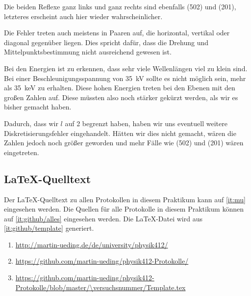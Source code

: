 Die beiden Reflexe ganz links und ganz rechts sind ebenfalls (502) und (201),
letzteres erscheint auch hier wieder wahrscheinlicher.

Die Fehler treten auch meistens in Paaren auf, die horizontal, vertikal oder
diagonal gegenüber liegen. Dies spricht dafür, dass die Drehung und
Mittelpunktsbestimmung nicht ausreichend gewesen ist.

Bei den Energien ist zu erkennen, dass sehr viele Wellenlängen viel zu klein
sind. Bei einer Beschleunigungsspannung von \SI{35}{\kilo\volt} sollte es
nicht möglich sein, mehr als \SI{35}{\kilo\electronvolt} zu erhalten. Diese
hohen Energien treten bei den Ebenen mit den großen Zahlen auf. Diese müssten
also noch stärker gekürzt werden, als wir es bisher gemacht haben.

Dadurch, dass wir $l$ auf 2 begrenzt haben, haben wir uns eventuell weitere
Diskretisierungsfehler eingehandelt. Hätten wir dies nicht gemacht, wären die
Zahlen jedoch noch größer geworden und mehr Fälle wie (502) und (201) wären
eingetreten.


\FloatBarrier
\begin{appendix}
    \FloatBarrier
    \chapter{\LaTeX-Quelltext}

    Der \LaTeX-Quelltext zu allen Protokollen in diesem Praktikum kann auf
    \ref{it:mu} eingesehen werden. Die Quellen für alle Protokolle in diesem
    Praktikum können auf \ref{it:github/alles} eingesehen werden. Die
    \LaTeX-Datei wird aus \ref{it:github/template} generiert.

    \begin{enumerate}
        \item
            \label{it:mu}
            \url{http://martin-ueding.de/de/university/physik412/}
        \item
            \label{it:github/alles}
            \url{https://github.com/martin-ueding/physik412-Protokolle/}
        \item
            \label{it:github/template}
            \url{https://github.com/martin-ueding/physik412-Protokolle/blob/master/\versuchsnummer/Template.tex}
    \end{enumerate}
\end{appendix}


\FloatBarrier
\printbibliography



